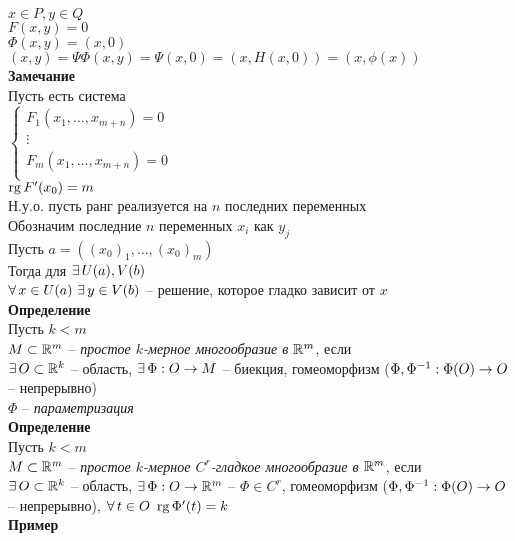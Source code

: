\documentclass[12pt]{article}
\begin{document}
$x \in P, y \in Q$\\
$F(x,y) = 0$\\
$\Phi(x,y) = (x,0)$\\
$(x,y) = \Psi\Phi(x,y) = \Psi(x,0) = (x, H(x,0)) = (x, \phi(x))$\\
\textbf{Замечание}\\
Пусть есть система\\
$\left\{\begin{array}{l}
    F_1(x_1, \ldots, x_{m+n}) = 0\\
    \vdots\\
    F_m(x_1, \ldots, x_{m+n}) = 0\\
\end{array}\right.$\\
$\operatorname{rg} F'(x_0) = m$\\
Н.у.о. пусть ранг реализуется на $n$ последних переменных\\
Обозначим последние $n$ переменных $x_i$ как $y_{j}$\\
Пусть $a = ((x_0)_1, \ldots, (x_0)_m)$\\
Тогда для $\exists\, U(a), V(b)$\\
$\forall\, x \in U(a)\ \exists\, y\in V(b)$ -- решение, которое гладко зависит от $x$\\
\textbf{Определение}\\
Пусть $k < m$\\
$M \subset \mathbb{R}^m$ -- \textit{простое $k$-мерное многообразие в $\mathbb{R}^m$}, если\\
$\exists\, O \subset \mathbb{R}^k$ -- область, $\exists\, \Phi: O \rightarrow M$ -- биекция, гомеоморфизм ($\Phi, \Phi^{-1}: \Phi(O)\rightarrow O$ -- непрерывно)\\
$\Phi$ -- \textit{параметризация}\\
\textbf{Определение}\\
Пусть $k < m$\\
$M \subset \mathbb{R}^m$ -- \textit{простое $k$-мерное $C^r$-гладкое многообразие в $\mathbb{R}^m$}, если\\
$\exists\, O \subset \mathbb{R}^k$ -- область, $\exists\, \Phi: O \rightarrow \mathbb{R}^m$ -- $\Phi \in C^r$, гомеоморфизм ($\Phi, \Phi^{-1}: \Phi(O)\rightarrow O$ -- непрерывно), $\forall\, t \in O\ \operatorname{rg} \Phi'(t) = k$\\
\textbf{Пример}
\end{document}
